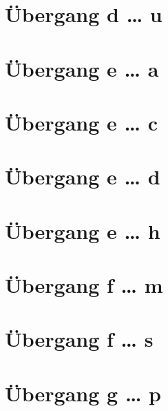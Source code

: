 \documentclass[a4paper,landscape]{article}
\begin{document}
\section{Übergang d … u }

\hspace*{-1ex}
\newpage


\section{Übergang e … a }

\hspace*{-1ex}
\newpage

\section{Übergang e … c }

\hspace*{-1ex}
\newpage

\section{Übergang e … d }

\hspace*{-1ex}
\newpage

\section{Übergang e … h }

\hspace*{-1ex}
\newpage

\section{Übergang f … m }

\hspace*{-1ex}
\newpage

\section{Übergang f … s }

\hspace*{-1ex}
\newpage

\section{Übergang g … p }
\end{document}
